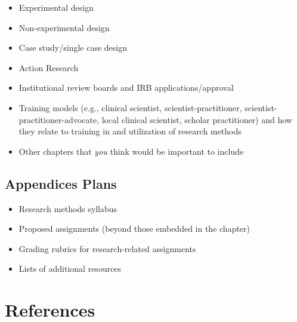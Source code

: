 \documentclass[
  11pt,
]{book}
\providecommand{\tightlist}{%
  \setlength{\itemsep}{0pt}\setlength{\parskip}{0pt}}
\begin{document}
\begin{itemize}
\tightlist
\item
  Experimental design
\item
  Non-experimental design
\item
  Case study/single case design
\item
  Action Research
\item
  Institutional review boards and IRB applications/approval
\item
  Training models (e.g., clinical scientist, scientist-practitioner, scientist-practitioner-advocate, local clinical scientist, scholar practitioner) and how they relate to training in and utilization of research methods
\item
  Other chapters that \emph{you} think would be important to include
\end{itemize}

\hypertarget{appendices-plans}{%
\section{Appendices Plans}\label{appendices-plans}}

\begin{itemize}
\tightlist
\item
  Research methods syllabus
\item
  Proposed assignments (beyond those embedded in the chapter)
\item
  Grading rubrics for research-related assignments
\item
  Lists of additional resources
\end{itemize}

\hypertarget{references-4}{%
\chapter{References}\label{references-4}}

  
\end{document}
